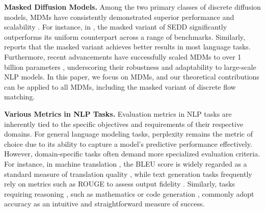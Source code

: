 \textbf{Masked Diffusion Models. }  
Among the two primary classes of discrete diffusion models, MDMs have consistently demonstrated superior performance and scalability \citep{lou2024discrete,campbell2024generative}. For instance, in \citet{lou2024discrete}, the masked variant of SEDD significantly outperforms its uniform counterpart across a range of benchmarks. Similarly, \citet{campbell2024generative} reports that the masked variant achieves better results in most language tasks. Furthermore, recent advancements have successfully scaled MDMs to over 1 billion parameters \citep{gat2024discrete,nie2024scaling,gong2024scaling,shi2024simplified}, underscoring their robustness and adaptability to large-scale NLP models. In this paper, we focus on MDMs, and our theoretical contributions can be applied to all MDMs, including the masked variant of discrete flow matching.


\textbf{Various Metrics in NLP Tasks.}  
Evaluation metrics in NLP tasks are inherently tied to the specific objectives and requirements of their respective domains. For general language modeling tasks, perplexity \citep{jelinek1977perplexity,Devlin2019BERT} remains the metric of choice due to its ability to capture a model's predictive performance effectively. However, domain-specific tasks often demand more specialized evaluation criteria. For instance, in machine translation \citep{bahdanau2014neural,wu2016google}, the BLEU score is widely regarded as a standard measure of translation quality \citep{papineni2002bleu}, while text generation tasks \citep{sutskever2014sequence} frequently rely on metrics such as ROUGE to assess output fidelity \citep{lin2004rouge}. Similarly, tasks requiring reasoning \citep{wei2022chain}, such as mathematics \citep{bubeck2023sparks} or code generation \citep{roziere2023code,ouyang2023llm}, commonly adopt accuracy as an intuitive and straightforward measure of success.
\vspace{-2pt}

